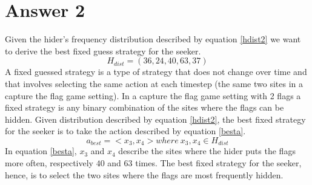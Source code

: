 \documentclass[runningheads]{llncs}
\begin{document}
\section{Answer 2}
Given the hider's frequency distribution described by equation \ref{hdist2}
we want to derive the best fixed guess strategy for the seeker.
\begin{equation}\label{hdist2}
  H_{dist} = (36, 24, 40, 63, 37)
\end{equation}
A fixed guessed strategy is a type of strategy that does not change
over time and that involves selecting the same action at each
timestep (the same two sites in a capture the flag game setting). In a
capture the flag game setting with 2 flags a fixed strategy is any
binary combination of the sites where the flags can be hidden. Given
distribution described by equation \ref{hdist2}, the best fixed
strategy for the seeker is to take the action described by equation
\ref{besta}.
\begin{equation}\label{besta}
  a_{best} = <x_3, x_4> where \:x_3, x_4 \in H_{dist}
\end{equation}
In equation \ref{besta}, $x_3$ and $x_4$ describe the sites where the
hider puts the flags more often, respectively $40$ and $63$ times. The
best fixed strategy for the seeker, hence, is to select the two sites
where the flags are most frequently hidden.
\end{document}
